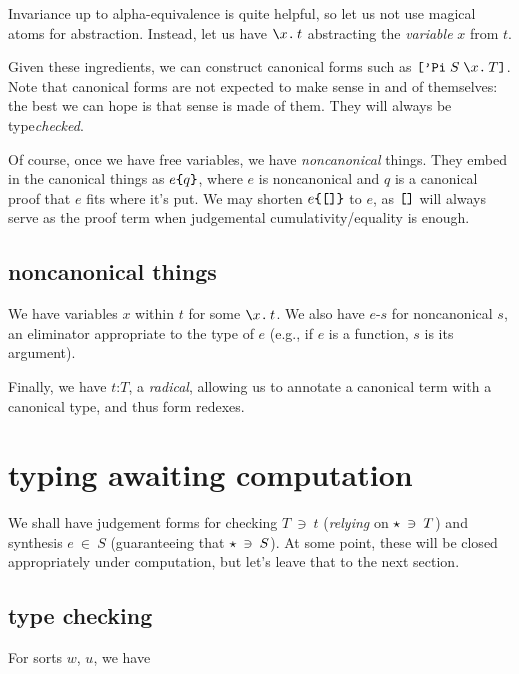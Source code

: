 \documentclass{article}
\newcommand{\lsq}{\texttt{\symbol{91}}}
\newcommand{\rsq}{\texttt{\symbol{93}}}
\begin{document}
Invariance up to alpha-equivalence is quite helpful, so let us not use magical atoms for abstraction. Instead, let us have $\B xt$ abstracting the \emph{variable} $x$ from $t$.

Given these ingredients, we can construct canonical forms such as $\PI SxT$. Note that canonical forms are not expected to make sense in and of themselves: the best we can hope is that sense is made of them. They will always be type\emph{checked}.

Of course, once we have free variables, we have \emph{noncanonical} things. They embed in the canonical things as $\E eq$, where $e$ is noncanonical and $q$ is a canonical proof that $e$ fits where it's put. We may shorten $\E e\nil$ to $e$, as $\nil$ will always serve as the proof term when judgemental cumulativity/equality is enough.


\subsection{noncanonical things}

\newcommand{\e}[1]{\texttt{-}#1}
\newcommand{\R}[2]{#1\texttt{:}#2}

We have variables $x$ within $t$ for some $\B xt$. We also have $e\e s$ for noncanonical $s$, an eliminator appropriate to the type of $e$ (e.g., if $e$ is a function, $s$ is its argument).

Finally, we have $\R tT$, a \emph{radical}, allowing us to annotate a canonical term with a canonical type, and thus form redexes.


\section{typing awaiting computation}

\newcommand{\ch}[2]{#1 \:\ni\: #2}
\newcommand{\sy}[2]{#1 \:\in\: #2}
\newcommand{\hy}{\;\vdash\;}
\newcommand{\CU}[2]{\lsq\A{Le}\:#1\:#2\rsq}

We shall have judgement forms for checking $\ch Tt$ (\emph{relying} on $\ch\TYPE T$) and synthesis $\sy eS$ (guaranteeing that $\ch\TYPE S$). At some point, these will be closed appropriately under computation, but let's leave that to the next section.


\subsection{type checking}

For sorts $w$, $u$, we have
\end{document}
